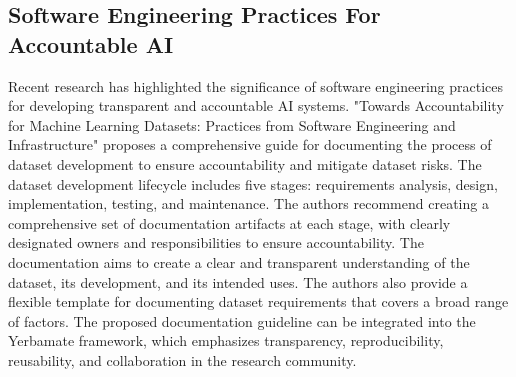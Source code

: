 \subsection{Software Engineering Practices For Accountable AI}

Recent research has highlighted the significance of software engineering practices for developing transparent and accountable AI systems. "Towards Accountability for Machine Learning Datasets: Practices from Software Engineering and Infrastructure" proposes a comprehensive guide for documenting the process of dataset development to ensure accountability and mitigate dataset risks. The dataset development lifecycle includes five stages: requirements analysis, design, implementation, testing, and maintenance. The authors recommend creating a comprehensive set of documentation artifacts at each stage, with clearly designated owners and responsibilities to ensure accountability. The documentation aims to create a clear and transparent understanding of the dataset, its development, and its intended uses. The authors also provide a flexible template for documenting dataset requirements that covers a broad range of factors. The proposed documentation guideline can be integrated into the Yerbamate framework, which emphasizes transparency, reproducibility, reusability, and collaboration in the research community.


